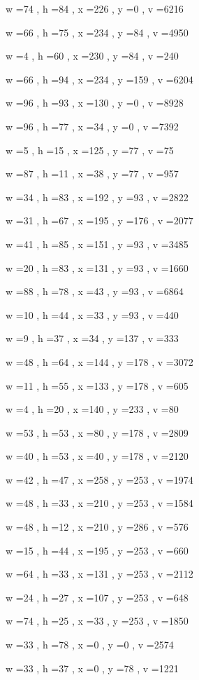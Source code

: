 \documentclass[11pt]{article}
\begin{document}
w =74 , h =84 , x =226 , y =0 , v =6216
\par
w =66 , h =75 , x =234 , y =84 , v =4950
\par
w =4 , h =60 , x =230 , y =84 , v =240
\par
w =66 , h =94 , x =234 , y =159 , v =6204
\par
w =96 , h =93 , x =130 , y =0 , v =8928
\par
w =96 , h =77 , x =34 , y =0 , v =7392
\par
w =5 , h =15 , x =125 , y =77 , v =75
\par
w =87 , h =11 , x =38 , y =77 , v =957
\par
w =34 , h =83 , x =192 , y =93 , v =2822
\par
w =31 , h =67 , x =195 , y =176 , v =2077
\par
w =41 , h =85 , x =151 , y =93 , v =3485
\par
w =20 , h =83 , x =131 , y =93 , v =1660
\par
w =88 , h =78 , x =43 , y =93 , v =6864
\par
w =10 , h =44 , x =33 , y =93 , v =440
\par
w =9 , h =37 , x =34 , y =137 , v =333
\par
w =48 , h =64 , x =144 , y =178 , v =3072
\par
w =11 , h =55 , x =133 , y =178 , v =605
\par
w =4 , h =20 , x =140 , y =233 , v =80
\par
w =53 , h =53 , x =80 , y =178 , v =2809
\par
w =40 , h =53 , x =40 , y =178 , v =2120
\par
w =42 , h =47 , x =258 , y =253 , v =1974
\par
w =48 , h =33 , x =210 , y =253 , v =1584
\par
w =48 , h =12 , x =210 , y =286 , v =576
\par
w =15 , h =44 , x =195 , y =253 , v =660
\par
w =64 , h =33 , x =131 , y =253 , v =2112
\par
w =24 , h =27 , x =107 , y =253 , v =648
\par
w =74 , h =25 , x =33 , y =253 , v =1850
\par
w =33 , h =78 , x =0 , y =0 , v =2574
\par
w =33 , h =37 , x =0 , y =78 , v =1221
\par
\newpage
\end{document}
